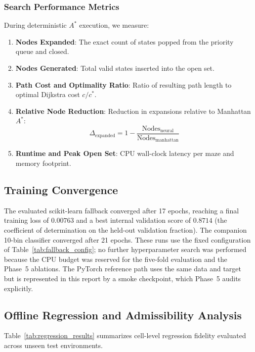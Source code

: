 \subsubsection{Search Performance Metrics}
During deterministic $A^\ast$ execution, we measure:
\begin{enumerate}
    \item \textbf{Nodes Expanded}: The exact count of states popped from the priority queue and closed.
    \item \textbf{Nodes Generated}: Total valid states inserted into the open set.
    \item \textbf{Path Cost and Optimality Ratio}: Ratio of resulting path length to optimal Dijkstra cost $c / c^\ast$.
    \item \textbf{Relative Node Reduction}: Reduction in expansions relative to Manhattan $A^\ast$:
    \begin{equation}
        \Delta_{\text{expanded}} = 1 - \frac{\text{Nodes}_{\text{neural}}}{\text{Nodes}_{\text{manhattan}}}
    \end{equation}
    \item \textbf{Runtime and Peak Open Set}: CPU wall-clock latency per maze and memory footprint.
\end{enumerate}

\subsection{Training Convergence}
The evaluated scikit-learn fallback converged after 17 epochs, reaching a final training
loss of $0.00763$ and a best internal validation score of $0.8714$ (the coefficient of
determination on the held-out validation fraction). The companion 10-bin classifier
converged after 21 epochs. These runs use the fixed configuration of
Table~\ref{tab:fallback_config}; no further hyperparameter search was performed because
the CPU budget was reserved for the five-fold evaluation and the Phase~5 ablations. The
PyTorch reference path uses the same data and target but is represented in this report by
a smoke checkpoint, which Phase~5 audits explicitly.

\subsection{Offline Regression and Admissibility Analysis}
Table~\ref{tab:regression_results} summarizes cell-level regression fidelity evaluated across
unseen test environments.

